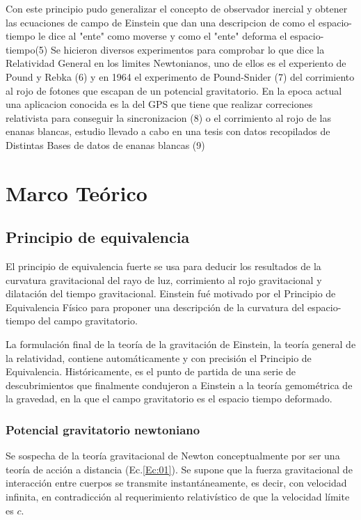 \documentclass[12pt,twoside]{rif}
\begin{document}
Con este principio pudo generalizar el concepto de observador inercial y obtener las ecuaciones de campo de Einstein que dan
una descripcion de como el espacio-tiempo le dice al "ente" como moverse y como el "ente" deforma el espacio-tiempo(5)
Se hicieron diversos experimentos para comprobar lo que dice la Relatividad General en los limites Newtonianos, uno de ellos 
es el experiento de  Pound y Rebka (6) y en 1964 el experimento de Pound-Snider (7) del corrimiento al rojo de fotones que
escapan de un potencial gravitatorio.
En la epoca actual una aplicacion conocida es la del GPS que tiene que realizar correciones relativista para conseguir la 
sincronizacion (8) o el corrimiento al rojo de las enanas blancas, estudio llevado a cabo en una tesis con datos recopilados de 
Distintas Bases de datos de enanas blancas (9)
	\section{Marco Teórico}

		\subsection{Principio de equivalencia}
		El principio de equivalencia fuerte se usa para deducir los resultados de la curvatura gravitacional del rayo de luz, corrimiento al rojo gravitacional y dilatación del tiempo gravitacional. Einstein fué motivado por el Principio de Equivalencia Físico para proponer una descripción de la curvatura del espacio-tiempo del campo gravitatorio. \citep*{TaPeuCheng2005}

		La formulación final de la teoría de la gravitación de Einstein, la teoría general de la relatividad, contiene automáticamente y con precisión el Principio de Equivalencia. Históricamente, es el punto de partida de una serie de descubrimientos que finalmente condujeron a Einstein a la teoría gemométrica de la gravedad, en la que el campo gravitatorio es el espacio tiempo deformado.

			\subsubsection{Potencial gravitatorio newtoniano}
			Se sospecha de la teoría gravitacional de Newton conceptualmente por ser una teoría de acción a distancia (Ec.\ref*{Ec:01}). Se supone que la fuerza gravitacional de interacción entre cuerpos se transmite instantáneamente, es decir, con velocidad infinita, en contradicción al requerimiento relativístico de que la velocidad límite es $c$. \citep*{resnick1968introduction}
			
\end{document}
